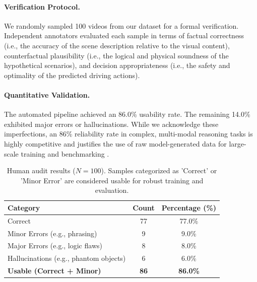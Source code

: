 \documentclass{article}
\begin{document}
\paragraph{Verification Protocol.} 
We randomly sampled 100 videos from our dataset for a formal verification. Independent annotators evaluated each sample in terms of factual correctness (i.e., the accuracy of the scene description relative to the visual content), counterfactual plausibility (i.e., the logical and physical soundness of the hypothetical scenarios), and decision appropriateness (i.e., the safety and optimality of the predicted driving actions).

\paragraph{Quantitative Validation.} 
The automated pipeline achieved an 86.0\% usability rate. The remaining 14.0\% exhibited major errors or hallucinations. While we acknowledge these imperfections, an 86\% reliability rate in complex, multi-modal reasoning tasks is highly competitive and justifies the use of raw model-generated data for large-scale training and benchmarking \cite{dataset:lingoqa}.

\begin{table}[h]
\centering
\begin{tabular}{lcc}
\toprule
\textbf{Category} & \textbf{Count} & \textbf{Percentage (\%)} \\
\midrule
Correct & 77 & 77.0\% \\
Minor Errors (e.g., phrasing) & 9 & 9.0\% \\
Major Errors (e.g., logic flaws) & 8 & 8.0\% \\
Hallucinations (e.g., phantom objects) & 6 & 6.0\% \\
\midrule
\textbf{Usable (Correct + Minor)} & \textbf{86} & \textbf{86.0\%} \\
\bottomrule
\end{tabular}
\caption{Human audit results ($N=100$). Samples categorized as 'Correct' or 'Minor Error' are considered usable for robust training and evaluation.}
\label{tab:human_eval_results}
\end{table}
\end{document}
